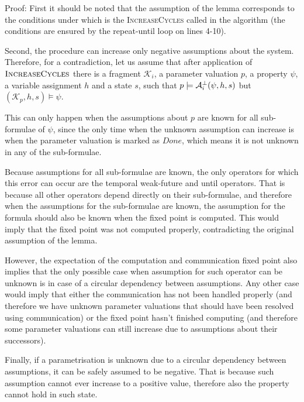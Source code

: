 Proof: First it should be noted that the assumption of the lemma corresponds to the conditions under which is the \textsc{IncreaseCycles} called in the algorithm (the conditions are ensured by the repeat-until loop on lines 4-10). 

Second, the procedure can increase only negative assumptions about the system. Therefore, for a contradiction, let us assume that after application of $\textsc{IncreaseCycles}$ there is a fragment $\mathcal{K}_i$, a parameter valuation $p$, a property $\psi$, a variable assignment $h$ and a state $s$, such that $p \models \mathcal{A}^\bot_i(\psi, h, s)$ but $(\mathcal{K}_p, h, s) \models \psi$. 

This can only happen when the assumptions about $p$ are known for all sub-formulae of $\psi$, since the only time when the unknown assumption can increase is when the parameter valuation is marked as $Done$, which means it is not unknown in any of the sub-formulae.

Because assumptions for all sub-formulae are known, the only operators for which this error can occur are the temporal weak-future and until operators. That is because all other operators depend directly on their sub-formulae, and therefore when the assumptions for the sub-formulae are known, the assumption for the formula should also be known when the fixed point is computed. This would imply that the fixed point was not computed properly, contradicting the original assumption of the lemma. 


However, the expectation of the computation and communication fixed point also implies that the only possible case when assumption for such operator can be unknown is in case of a circular dependency between assumptions. Any other case would imply that either the communication has not been handled properly (and therefore we have unknown parameter valuations that should have been resolved using communication) or the fixed point hasn't finished computing (and therefore some parameter valuations can still increase due to assumptions about their successors).

Finally, if a parametrisation is unknown due to a circular dependency between assumptions, it can be safely assumed to be negative. That is because such assumption cannot ever increase to a positive value, therefore also the property cannot hold in such state.

